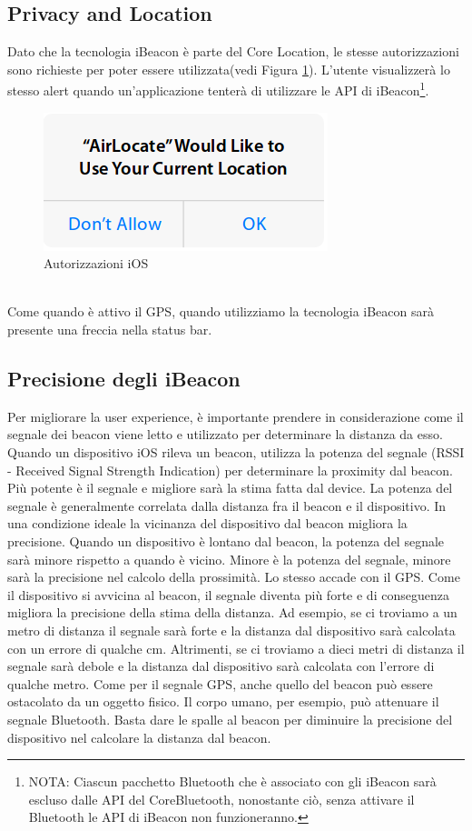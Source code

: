 \subsection{Privacy and Location}
Dato che la tecnologia iBeacon è parte del Core Location, le stesse autorizzazioni sono richieste per poter essere utilizzata(vedi Figura \ref{fig:autorizzazioni}).
L'utente visualizzerà lo stesso alert quando un'applicazione tenterà di utilizzare le API di iBeacon\footnote{NOTA: Ciascun pacchetto Bluetooth che è associato con gli iBeacon sarà escluso dalle API del CoreBluetooth, nonostante ciò, senza attivare il Bluetooth le API di iBeacon non funzioneranno.}.
\begin{figure}[t]
\centering
\includegraphics[scale=0.6]{Immagini/alert.png}
\caption{Autorizzazioni iOS} 
\label{fig:autorizzazioni}
\end{figure}\\
Come quando è attivo il GPS, quando utilizziamo la tecnologia iBeacon sarà presente una freccia nella status bar.
\subsection{Precisione degli iBeacon}
Per migliorare la user experience, è importante prendere in considerazione come il segnale dei beacon viene letto e utilizzato per determinare la distanza da esso. 
Quando un dispositivo iOS rileva un beacon, utilizza la potenza del segnale (RSSI - Received Signal Strength Indication) per determinare la proximity dal beacon.
Più potente è il segnale e migliore sarà la stima fatta dal device.
La potenza del segnale è generalmente correlata dalla distanza fra il beacon e il dispositivo. In una condizione ideale la vicinanza del dispositivo dal beacon migliora la precisione.
Quando un dispositivo è lontano dal beacon, la potenza del segnale sarà minore rispetto a quando è vicino. 
Minore è la potenza del segnale, minore sarà la precisione nel calcolo della prossimità. 
Lo stesso accade con il GPS.
Come il dispositivo si avvicina al beacon, il segnale diventa più forte e di conseguenza migliora la precisione della stima della distanza.
Ad esempio, se ci troviamo a un metro di distanza il segnale sarà forte e la distanza dal dispositivo sarà calcolata con un errore di qualche cm.
Altrimenti, se ci troviamo a dieci metri di distanza il segnale sarà debole e la distanza dal dispositivo sarà calcolata con l'errore di qualche metro. 
Come per il segnale GPS, anche quello del beacon può essere ostacolato da un oggetto fisico.  
Il corpo umano, per esempio, può attenuare il segnale Bluetooth. 
Basta dare le spalle al beacon per diminuire la precisione del dispositivo nel calcolare la distanza dal beacon.

